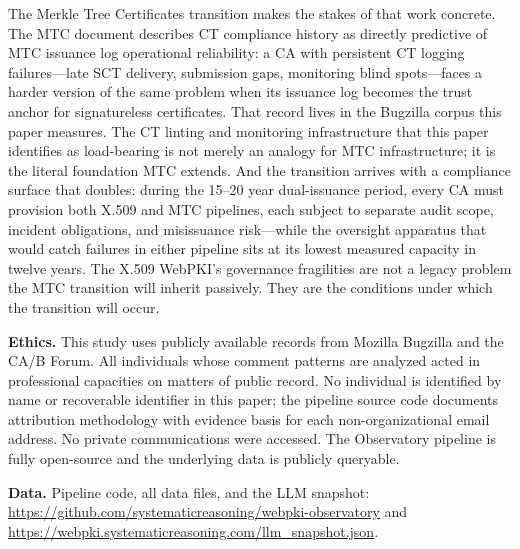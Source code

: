 \documentclass[10pt,twocolumn,letterpaper]{article}
\begin{document}
The Merkle Tree Certificates transition makes the stakes of that work
concrete. The MTC document describes CT compliance history as directly
predictive of MTC issuance log operational reliability: a CA with
persistent CT logging failures---late SCT delivery, submission gaps,
monitoring blind spots---faces a harder version of the same problem
when its issuance log becomes the trust anchor for signatureless
certificates. That record lives in the Bugzilla corpus this paper
measures. The CT linting and monitoring infrastructure that this
paper identifies as load-bearing is not merely an analogy for MTC
infrastructure; it is the literal foundation MTC extends. And the
transition arrives with a compliance surface that doubles: during the
15--20 year dual-issuance period, every CA must provision both X.509
and MTC pipelines, each subject to separate audit scope, incident
obligations, and misissuance risk---while the oversight apparatus
that would catch failures in either pipeline sits at its lowest
measured capacity in twelve years. The X.509 WebPKI's governance
fragilities are not a legacy problem the MTC transition will inherit
passively. They are the conditions under which the transition will
occur.

\textbf{Ethics.} This study uses publicly available records from Mozilla
Bugzilla and the CA/B Forum. All individuals whose comment patterns are
analyzed acted in professional capacities on matters of public record.
No individual is identified by name or recoverable identifier in this
paper; the pipeline source code documents attribution methodology with
evidence basis for each non-organizational email address. No private
communications were accessed. The Observatory pipeline is fully
open-source and the underlying data is publicly queryable.

\textbf{Data.} Pipeline code, all data files, and the LLM snapshot:
\url{https://github.com/systematicreasoning/webpki-observatory} and
\url{https://webpki.systematicreasoning.com/llm_snapshot.json}.
\end{document}
